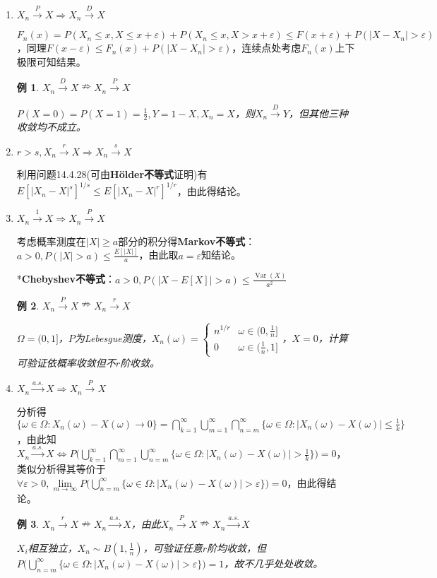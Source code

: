 \documentclass[a4paper,UTF8,fontset=windows]{ctexart}
\newtheorem{exmp}{例}[section]
\DeclareMathOperator{\Var}{Var}
\newcommand{\con}[1]{\stackrel{#1}{\longrightarrow}}
\begin{document}
\begin{enumerate}
	\item $X_n\con{P}X\Rightarrow X_n\con{D}X$
	
	$F_n(x)=P(X_n\le x,X\le x+\varepsilon)+P(X_n\le x,X>x+\varepsilon)\le F(x+\varepsilon)+P(|X-X_n|>\varepsilon)$，同理$F(x-\varepsilon)\le F_n(x)+P(|X-X_n|>\varepsilon)$，连续点处考虑$F_n(x)$上下极限可知结果。
	
	\begin{exmp} $X_n\con{D}X\nRightarrow X_n\con{P}X$
	
	$P(X=0)=P(X=1)=\frac{1}{2},Y=1-X,X_n=X$，则$X_n\con{D}Y$，但其他三种收敛均不成立。
	\end{exmp}
	
	\item $r>s,X_n\con{r}X\Rightarrow X_n\con{s}X$
	
	利用问题14.4.28(可由\textbf{H\"older不等式}证明)有$E[|X_n-X|^s]^{1/s}\le E[|X_n-X|^r]^{1/r}$，由此得结论。
	
	\item $X_n\con{1}X\Rightarrow X_n\con{P}X$
	
	考虑概率测度在$|X|\ge a$部分的积分得\textbf{Markov不等式}：$a>0,P(|X|>a)\le\frac{E[|X|]}{a}$，由此取$a=\varepsilon$知结论。
	
	*\textbf{Chebyshev不等式}：$a>0,P(|X-E[X]|>a)\le\frac{\Var(X)}{a^2}$
	
	\begin{exmp} $X_n\con{P}X\nRightarrow X_n\con{r}X$
	
	$\Omega=(0,1]$，$P$为Lebesgue测度，$X_n(\omega)=\begin{cases}n^{1/r}&\omega\in\bigg(0,\frac{1}{n}\bigg]\\[2ex]0&\omega\in\bigg(\frac{1}{n},1\bigg]\end{cases}$，$X=0$，计算可验证依概率收敛但不$r$阶收敛。
	\end{exmp}
	
	\item $X_n\con{a.s.}X\Rightarrow X_n\con{P}X$
	
	分析得$\{\omega\in\Omega:X_n(\omega)-X(\omega)\con{}0\}=\bigcap_{k=1}^\infty\bigcup_{m=1}^\infty\bigcap_{n=m}^\infty\{\omega\in\Omega:|X_n(\omega)-X(\omega)|\le\frac{1}{k}\}$，由此知$X_n\con{a.s.}X\Leftrightarrow P\bigg(\bigcup_{k=1}^\infty\bigcap_{m=1}^\infty\bigcup_{n=m}^\infty\{\omega\in\Omega:|X_n(\omega)-X(\omega)|>\frac{1}{k}\}\bigg)=0$，类似分析得其等价于$\forall\varepsilon>0,\lim\limits_{m\to\infty}P\bigg(\bigcup_{n=m}^\infty\{\omega\in\Omega:|X_n(\omega)-X(\omega)|>\varepsilon\}\bigg)=0$，由此得结论。
	
	\begin{exmp} $X_n\con{r}X\nRightarrow X_n\con{a.s.}X$，由此$X_n\con{P}X\nRightarrow X_n\con{a.s.}X$
	
	$X_i$相互独立，$X_n\sim B(1,\frac{1}{n})$，可验证任意$r$阶均收敛，但$P\bigg(\bigcup_{n=m}^\infty\{\omega\in\Omega:|X_n(\omega)-X(\omega)|>\varepsilon\}\bigg)=1$，故不几乎处处收敛。
	\end{exmp}
\end{enumerate}
\end{document}

